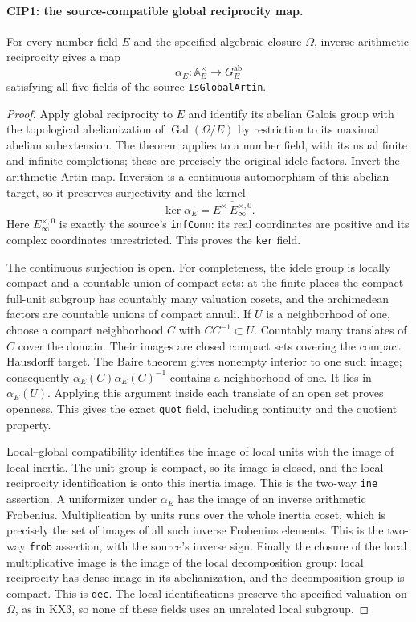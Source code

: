 \paragraph{CIP1: the source-compatible global reciprocity map.}
\label{claim:CIP1}
For every number field $E$ and the specified algebraic closure
$\Omega$, inverse arithmetic reciprocity gives a map
\[
 \alpha_E:\mathbb A_E^\times\longrightarrow G_E^{\mathrm{ab}}
\]
satisfying all five fields of the source \texttt{IsGlobalArtin}.
\begin{proof}
Apply global reciprocity to $E$ and identify its abelian Galois group
with the topological abelianization of $\operatorname{Gal}(\Omega/E)$
by restriction to its maximal abelian subextension.  The theorem
applies to a number field, with its usual finite and infinite
completions; these are precisely the original idele factors.
Invert the arithmetic Artin map.  Inversion is a continuous
automorphism of this abelian target, so it preserves surjectivity and
the kernel
\[
 \ker\alpha_E=
 \overline{E^\times\, E_\infty^{\times,0}}.          \tag{CIP.2}
\]
Here $E_\infty^{\times,0}$ is exactly the source's
\texttt{infConn}: its real coordinates are positive and its complex
coordinates unrestricted.  This proves the \texttt{ker} field.

The continuous surjection is open.  For completeness, the idele group
is locally compact and a countable union of compact sets: at the
finite places the compact full-unit subgroup has countably many
valuation cosets, and the archimedean factors are countable unions
of compact annuli.  If $U$ is a neighborhood of one, choose a compact
neighborhood $C$ with $CC^{-1}\subset U$.  Countably many translates
of $C$ cover the domain.  Their images are closed compact sets
covering the compact Hausdorff target.  The Baire theorem gives
nonempty interior to one such image; consequently
$\alpha_E(C)\alpha_E(C)^{-1}$ contains a neighborhood of one.
It lies in $\alpha_E(U)$.  Applying this argument inside each
translate of an open set proves openness.  This gives the exact
\texttt{quot} field, including continuity and the quotient property.

Local--global compatibility identifies the image of local units with
the image of local inertia.  The unit group is compact, so its image
is closed, and the local reciprocity identification is onto this
inertia image.  This is the two-way \texttt{ine} assertion.  A
uniformizer under $\alpha_E$ has the image of an inverse arithmetic
Frobenius.  Multiplication by units runs over the whole inertia
coset, which is precisely the set of images of all such inverse
Frobenius elements.  This is the two-way \texttt{frob} assertion,
with the source's inverse sign.  Finally the closure of the local
multiplicative image is the image of the local decomposition group:
local reciprocity has dense image in its abelianization, and the
decomposition group is compact.  This is \texttt{dec}.  The local
identifications preserve the specified valuation on $\Omega$, as in
KX3, so none of these fields uses an unrelated local subgroup.
\end{proof}

